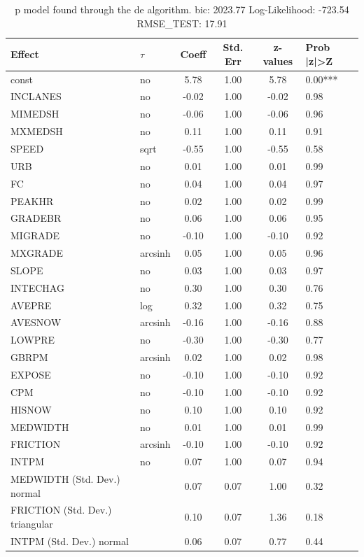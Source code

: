 \begin{table}
	\caption{p model found through the de algorithm. bic: 2023.77 Log-Likelihood: -723.54 RMSE_TEST: 17.91}
	\begin{center}
		\begin{tabular}{|l|l|c|c|c|l|}
			\hline
			Effect & $\tau$ & Coeff & Std. Err & z-values & Prob |z|>Z \\
			\hline
			const & no & 5.78 & 1.00 & 5.78 & 0.00*** \\
			\hline
			INCLANES & no & -0.02 & 1.00 & -0.02 & 0.98 \\
			\hline
			MIMEDSH & no & -0.06 & 1.00 & -0.06 & 0.96 \\
			\hline
			MXMEDSH & no & 0.11 & 1.00 & 0.11 & 0.91 \\
			\hline
			SPEED & sqrt & -0.55 & 1.00 & -0.55 & 0.58 \\
			\hline
			URB & no & 0.01 & 1.00 & 0.01 & 0.99 \\
			\hline
			FC & no & 0.04 & 1.00 & 0.04 & 0.97 \\
			\hline
			PEAKHR & no & 0.02 & 1.00 & 0.02 & 0.99 \\
			\hline
			GRADEBR & no & 0.06 & 1.00 & 0.06 & 0.95 \\
			\hline
			MIGRADE & no & -0.10 & 1.00 & -0.10 & 0.92 \\
			\hline
			MXGRADE & arcsinh & 0.05 & 1.00 & 0.05 & 0.96 \\
			\hline
			SLOPE & no & 0.03 & 1.00 & 0.03 & 0.97 \\
			\hline
			INTECHAG & no & 0.30 & 1.00 & 0.30 & 0.76 \\
			\hline
			AVEPRE & log & 0.32 & 1.00 & 0.32 & 0.75 \\
			\hline
			AVESNOW & arcsinh & -0.16 & 1.00 & -0.16 & 0.88 \\
			\hline
			LOWPRE & no & -0.30 & 1.00 & -0.30 & 0.77 \\
			\hline
			GBRPM & arcsinh & 0.02 & 1.00 & 0.02 & 0.98 \\
			\hline
			EXPOSE & no & -0.10 & 1.00 & -0.10 & 0.92 \\
			\hline
			CPM & no & -0.10 & 1.00 & -0.10 & 0.92 \\
			\hline
			HISNOW & no & 0.10 & 1.00 & 0.10 & 0.92 \\
			\hline
			MEDWIDTH & no & 0.01 & 1.00 & 0.01 & 0.99 \\
			\hline
			FRICTION & arcsinh & -0.10 & 1.00 & -0.10 & 0.92 \\
			\hline
			INTPM & no & 0.07 & 1.00 & 0.07 & 0.94 \\
			\hline
			MEDWIDTH (Std. Dev.) normal &  & 0.07 & 0.07 & 1.00 & 0.32 \\
			\hline
			FRICTION (Std. Dev.) triangular &  & 0.10 & 0.07 & 1.36 & 0.18 \\
			\hline
			INTPM (Std. Dev.) normal &  & 0.06 & 0.07 & 0.77 & 0.44 \\
			\hline
		\end{tabular}
	\end{center}
\end{table}